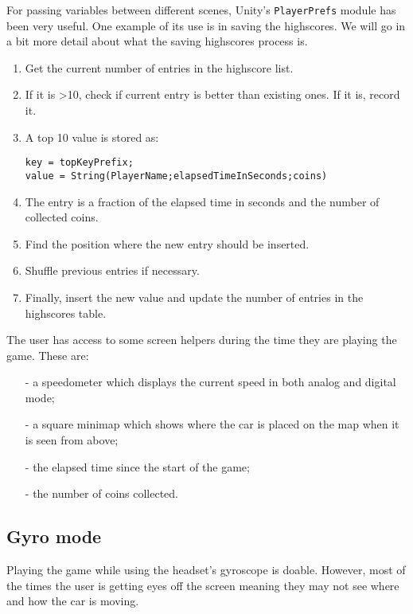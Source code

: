 For passing variables between different scenes, Unity's \texttt{PlayerPrefs} module has been very useful. One example of its use is in saving the highscores. We will go in a bit more detail about what the saving highscores process is.
\begin{enumerate}
	\item Get the current number of entries in the highscore list.
	\item If it is \textgreater  10, check if current entry is better than existing ones. If it is, record it.
	\item A top 10 value is stored as: 
	
	\begin{Verbatim}[frame=single, framesep=3mm]
key = topKeyPrefix;
value = String(PlayerName;elapsedTimeInSeconds;coins)
	\end{Verbatim}
	\item The entry is a fraction of the elapsed time in seconds and the number of collected coins.
	\item Find the position where the new entry should be inserted.
	\item Shuffle previous entries if necessary.
	\item Finally, insert the new value and update the number of entries in the highscores table.
\end{enumerate}

The user has access to some screen helpers during the time they are playing the game. These are:
\begin{itemize}
	\item[-] a speedometer which displays the current speed in both analog and digital mode;
	\item[-] a square minimap which shows where the car is placed on the map when it is seen from above;
	\item[-] the elapsed time since the start of the game;
	\item[-] the number of coins collected.
\end{itemize}

\subsection{Gyro mode}
Playing the game while using the headset's gyroscope is doable. However, most of the times the user is getting eyes off the screen meaning they may not see where and how the car is moving. 
